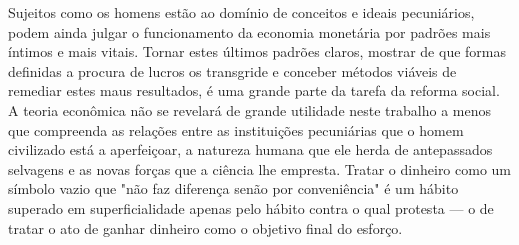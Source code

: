 \documentclass[12pt]{article}
\begin{document}
Sujeitos como os homens estão ao domínio de conceitos e ideais pecuniários, podem ainda julgar o funcionamento da economia monetária por padrões mais íntimos e mais vitais. Tornar estes últimos padrões claros, mostrar de que formas definidas a procura de lucros os transgride e conceber métodos viáveis de remediar estes maus resultados, é uma grande parte da tarefa da reforma social. A teoria econômica não se revelará de grande utilidade neste trabalho a menos que compreenda as relações entre as instituições pecuniárias que o homem civilizado está a aperfeiçoar, a natureza humana que ele herda de antepassados selvagens e as novas forças que a ciência lhe empresta. Tratar o dinheiro como um símbolo vazio que "não faz diferença senão por conveniência" é um hábito superado em superficialidade apenas pelo hábito contra o qual protesta — o de tratar o ato de ganhar dinheiro como o objetivo final do esforço.
\end{document}
